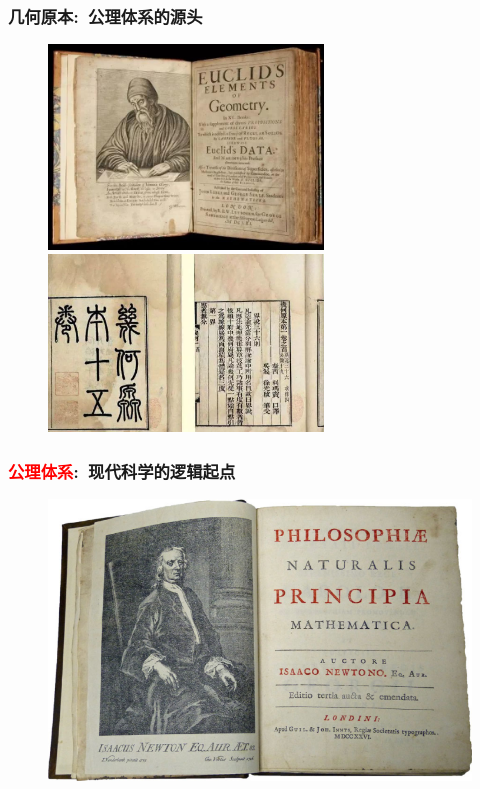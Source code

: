 \frame
{
	\frametitle{几何原本:~公理体系的源头}
\begin{figure}[h!]
\centering
\vspace{-13pt}
\includegraphics[height=0.38\textwidth,width=0.65\textwidth,viewport=0 0 680 500,clip]{Figures/Element_Geometry_1.jpg}\\
\vspace{1pt}
\includegraphics[height=0.36\textwidth,width=0.65\textwidth,viewport=0 0 810 500,clip]{Figures/Element_Geometry_2.jpg}
\label{Element_Geometru}
\end{figure}
}

\frame
{
	\frametitle{\textcolor{red}{公理体系}:~现代科学的逻辑起点}
\begin{figure}[h!]
\centering
\vspace{-10.5pt}
\includegraphics[height=0.68\textwidth,width=1.0\textwidth,viewport=0 0 770 500,clip]{Figures/Philp_Nature_Mach-2.png}
\label{Philp_Nature}
\end{figure}
}

